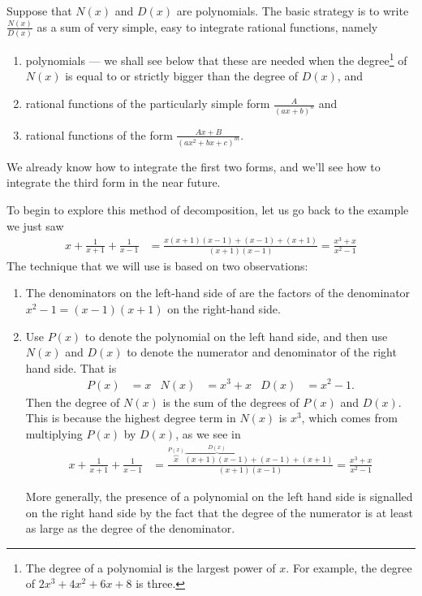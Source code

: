 Suppose that $N(x)$ and $D(x)$ are polynomials. The basic strategy is to write
$\frac{N(x)}{D(x)}$ as a sum of very simple, easy to integrate
rational functions, namely
\begin{enumerate}[(1)]
\item polynomials --- we shall see below that these are needed when the
degree\footnote{The degree of a polynomial is the largest power of $x$. For example, the
degree of $2x^3+4x^2+6x+8$ is three.} of $N(x)$ is equal to or strictly bigger than the
degree of  $D(x)$,  and
\item rational functions of the particularly simple form $\frac{A}{(ax+b)^n}$
and
\item rational functions of the form $\frac{Ax+B}{(ax^2+bx+c)^m}$.
\end{enumerate}
We already know how to integrate the first two forms, and we'll see how to integrate the
third form in the near future.

To begin to explore this method of decomposition, let us go back to the example we just
saw
\begin{align*}
x+\frac{1}{x+1} +\frac{1}{x-1}
&=\frac{x(x+1)(x-1) +(x-1) +(x+1)}{(x+1)(x-1)}
=\frac{x^3+x}{x^2-1}
\end{align*}
The technique that we will use is based on two observations:
\begin{enumerate}[(1)]
\item
The denominators on the left-hand side of are the factors of the denominator
$x^2-1=(x-1)(x+1)$ on the right-hand side.
\item Use $P(x)$ to denote the polynomial on the left hand side, and then use $N(x)$ and
$D(x)$ to denote the numerator and denominator of the right hand side. That is
\begin{align*}
  P(x)&=x & N(x)&= x^3+x & D(x)&= x^2-1.
\end{align*}
Then the degree of $N(x)$ is the sum of the degrees of $P(x)$ and $D(x)$. This is because
the highest degree term in $N(x)$ is $x^3$, which comes from multiplying $P(x)$ by $D(x)$,
as we see in
\begin{align*}
    x + \frac{1}{x+1} + \frac{1}{x-1}
  &=\frac{   \overbrace{x}^{P(x)}
	      \overbrace{(x+1)(x-1)}^{D(x)}
	      + (x-1) + (x+1)  }
	      {(x+1)(x-1)}
    =\frac{x^3+x}{x^2-1}
\end{align*}

More generally, the presence of a polynomial on the left hand side
is signalled on the right hand side by the fact that the degree of the
numerator is at least as large as the degree of the denominator.
\end{enumerate}

